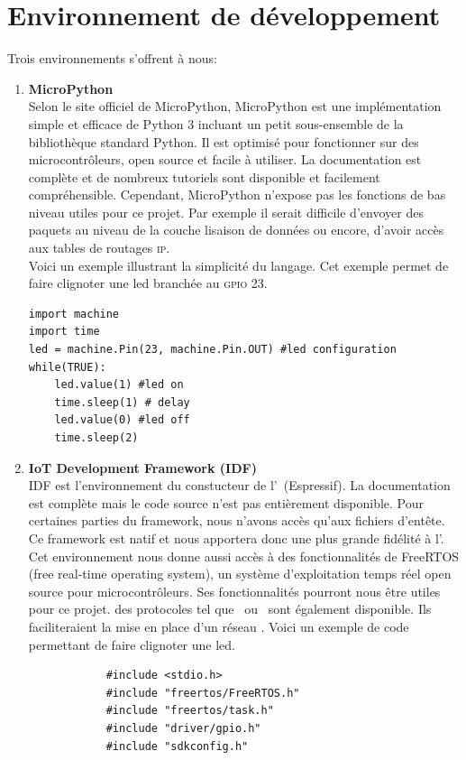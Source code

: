 \section{Environnement de développement}
    Trois environnements s'offrent à nous:
    \begin{enumerate}
        \item \textbf{MicroPython}\\
            Selon le site officiel de MicroPython\cite{micropython_w}, MicroPython
            est une implémentation simple et efficace de Python 3 incluant un
            petit sous-ensemble de la bibliothèque standard Python. Il est
            optimisé pour fonctionner sur des microcontrôleurs, open source et facile à utiliser.
            La documentation est complète et de nombreux tutoriels sont disponible et facilement compréhensible.
            Cependant, MicroPython n'expose pas les fonctions de bas niveau utiles pour ce projet.
            Par exemple il serait difficile d'envoyer des paquets au niveau de la
            couche lisaison de données ou encore, d'avoir accès aux tables de routages \textsc{ip}.\\
            Voici un exemple illustrant la simplicité du langage. Cet exemple permet de faire clignoter
            une led branchée au \textsc{gpio} 23.
            \begin{verbatim}
import machine
import time
led = machine.Pin(23, machine.Pin.OUT) #led configuration
while(TRUE):
    led.value(1) #led on
    time.sleep(1) # delay
    led.value(0) #led off
    time.sleep(2)
            \end{verbatim}
        
        \item \textbf{IoT Development Framework (IDF)}\\
            IDF est l'environnement du constucteur de l'\esp\ (Espressif).
            La documentation est complète mais le code source n'est pas entièrement
            disponible. Pour certaines parties du framework, nous n'avons accès qu'aux
            fichiers d'entête.
            Ce framework est natif et nous apportera donc une plus grande fidélité à l'\esp.
            Cet environnement nous donne aussi accès à des fonctionnalités de FreeRTOS
            (free real-time operating system), un système d'exploitation temps
            réel open source pour microcontrôleurs. Ses fonctionnalités pourront nous être 
            utiles pour ce projet.
            des protocoles tel que \espmesh\ ou
            \espnow\ sont également disponible. Ils faciliteraient la mise en place d'un réseau \mesh.
            Voici un exemple de code permettant de faire clignoter une led.
            \begin{verbatim}
            #include <stdio.h>
            #include "freertos/FreeRTOS.h"
            #include "freertos/task.h"
            #include "driver/gpio.h"
            #include "sdkconfig.h"


\end{verbatim}
\end{enumerate}
